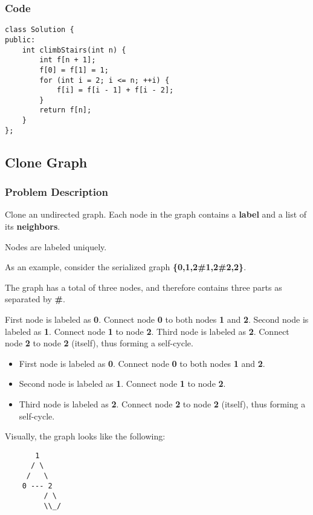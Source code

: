 \documentclass{article}
\begin{document}
\begin{CJK*}{UTF8}{gkai}
\subsubsection*{Code}
\begin{lstlisting}
class Solution {
public:
    int climbStairs(int n) {
        int f[n + 1];
        f[0] = f[1] = 1;
        for (int i = 2; i <= n; ++i) {
            f[i] = f[i - 1] + f[i - 2];
        }
        return f[n];
    }
}; 
\end{lstlisting}


\subsection{ Clone Graph }
\label{ Clone Graph }

\subsubsection*{Problem Description}
Clone an undirected graph. Each node in the graph contains a \textbf{label} and a list of its \textbf{neighbors}.

Nodes are labeled uniquely.

As an example, consider the serialized graph \textbf{\{0,1,2\#1,2\#2,2\}}.

The graph has a total of three nodes, and therefore contains three parts as separated by \textbf{\#}.

First node is labeled as \textbf{0}. Connect node \textbf{0} to both nodes \textbf{1} and \textbf{2}.
Second node is labeled as \textbf{1}. Connect node \textbf{1} to node \textbf{2}.
Third node is labeled as \textbf{2}. Connect node \textbf{2} to node \textbf{2} (itself), thus forming a self-cycle.

\begin{itemize}
\item First node is labeled as \textbf{0}. Connect node \textbf{0} to both nodes \textbf{1} and \textbf{2}.
\item Second node is labeled as \textbf{1}. Connect node \textbf{1} to node \textbf{2}.
\item Third node is labeled as \textbf{2}. Connect node \textbf{2} to node \textbf{2} (itself), thus forming a self-cycle.
\end{itemize}

Visually, the graph looks like the following:
\begin{verbatim}
       1
      / \
     /   \
    0 --- 2
         / \
         \\_/
\end{verbatim}



\end{CJK*}
\end{document}
